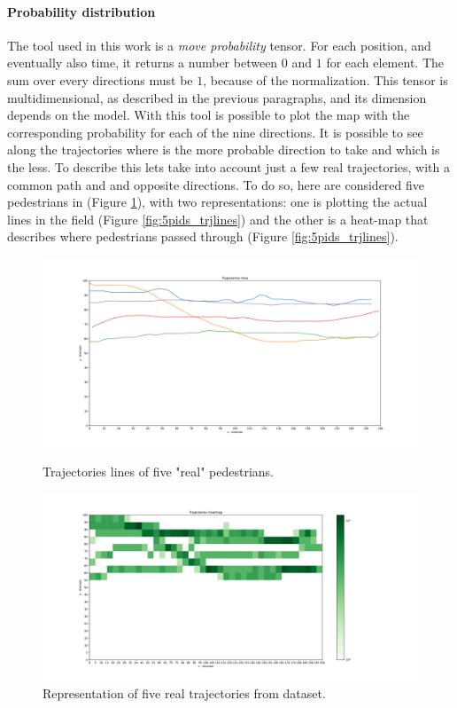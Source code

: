 \documentclass[class=article, crop=false]{standalone}
\begin{document}
\paragraph{Probability distribution}
The tool used in this work is a \emph{move probability} tensor.
For each position, and eventually also time, it returns a number between $0$ and $1$ for each element.
The sum over every directions must be $1$, because of the normalization.
This tensor is multidimensional, as described in the previous paragraphs, and its dimension depends on the model.
With this tool is possible to plot the map with the corresponding probability for each of the nine directions.
It is possible to see along the trajectories where is the more probable direction to take and which is the less.
To describe this lets take into account just a few real trajectories, with a common path and and opposite directions.
To do so, here are considered five pedestrians in (Figure \ref{fig:5pids_trjl}), with two representations:
one is plotting the actual lines in the field (Figure \ref{fig:5pids_trjlines}) and the other is a heat-map that describes where pedestrians passed through (Figure \ref{fig:5pids_trjlines}).
\begin{figure}[ht]
\begin{minipage}[c]{0.5\linewidth}
\centering
\includegraphics[scale=0.17]{fig/5pids/figure_trainf10_few_trajectories_Dx200_Dy100_TRJLINES}
\captionsetup{width=.8\linewidth}
\caption{Trajectories lines of five "real" pedestrians.}
\label{fig:5pids_trjlines}
\end{minipage}
\begin{minipage}[c]{0.5\linewidth}
\centering
\includegraphics[scale=0.17]{fig/5pids/figure_trainf10_few_trajectories_Dx200_Dy100_TRJHIST}
\captionsetup{width=.8\linewidth}
\caption{Representation of five real trajectories from dataset.}
\label{fig:5pids_trjl}
\end{minipage}
\end{figure}
\end{document}
